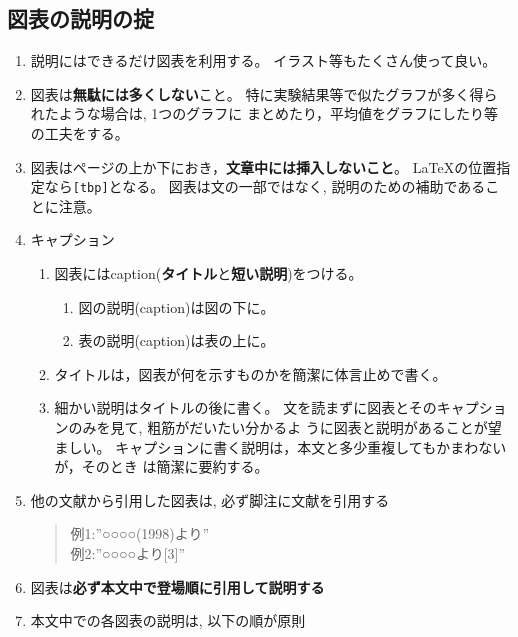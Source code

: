 \documentclass[12pt, ]{jsarticle}
\providecommand{\tightlist}{%
   \setlength{\itemsep}{0pt}\setlength{\parskip}{0pt}}
\begin{document}
\hypertarget{ux56f3ux8868ux306eux8aacux660eux306eux639f}{%
\subsection{図表の説明の掟}\label{ux56f3ux8868ux306eux8aacux660eux306eux639f}}

\begin{enumerate}
\item
  説明にはできるだけ図表を利用する。 イラスト等もたくさん使って良い。
\item
  図表は\textbf{無駄には多くしない}こと。
  特に実験結果等で似たグラフが多く得られたような場合は, 1つのグラフに
  まとめたり，平均値をグラフにしたり等の工夫をする。
\item
  図表はページの上か下におき，\textbf{文章中には挿入しないこと}。
  LaTeXの位置指定なら\passthrough{\lstinline![tbp]!}となる。
  図表は文の一部ではなく, 説明のための補助であることに注意。
\item
  キャプション

  \begin{enumerate}
  \tightlist
  \item
    図表にはcaption(\textbf{タイトル}と\textbf{短い説明})をつける。

    \begin{enumerate}
    \tightlist
    \item
      図の説明(caption)は図の下に。
    \item
      表の説明(caption)は表の上に。
    \end{enumerate}
  \item
    タイトルは，図表が何を示すものかを簡潔に体言止めで書く。
  \item
    細かい説明はタイトルの後に書く。
    文を読まずに図表とそのキャプションのみを見て, 粗筋がだいたい分かるよ
    うに図表と説明があることが望ましい。
    キャプションに書く説明は，本文と多少重複してもかまわないが，そのとき
    は簡潔に要約する。
  \end{enumerate}
\item
  他の文献から引用した図表は, 必ず脚注に文献を引用する

  \begin{quote}
  例1:''○○○○(1998)より''\\
  例2:''○○○○より{[}3{]}''
  \end{quote}
\item
  図表は\textbf{必ず本文中で登場順に引用して説明する}
\item
  本文中での各図表の説明は, 以下の順が原則


\end{enumerate}
\end{document}
